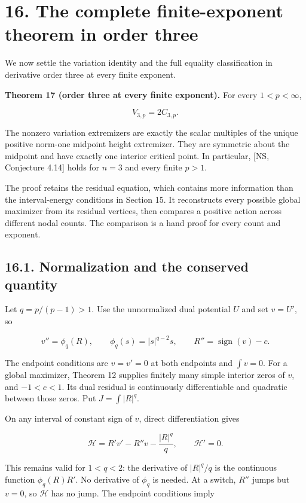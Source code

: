 \documentclass[11pt]{article}
\begin{document}
\section{16. The complete finite-exponent theorem in order
three}\label{the-complete-finite-exponent-theorem-in-order-three}

We now settle the variation identity and the full equality
classification in derivative order three at every finite exponent.

\textbf{Theorem 17 (order three at every finite exponent).} For every
\(1<p<\infty\),

\[
V_{3,p}=2C_{3,p}.
\tag{16.1}
\]

The nonzero variation extremizers are exactly the scalar multiples of
the unique positive norm-one midpoint height extremizer. They are
symmetric about the midpoint and have exactly one interior critical
point. In particular, {[}NS, Conjecture 4.14{]} holds for \(n=3\) and
every finite \(p>1\).

The proof retains the residual equation, which contains more information
than the interval-energy conditions in Section 15. It reconstructs every
possible global maximizer from its residual vertices, then compares a
positive action across different nodal counts. The comparison is a hand
proof for every count and exponent.

\subsection{16.1. Normalization and the conserved
quantity}\label{normalization-and-the-conserved-quantity}

Let \(q=p/(p-1)>1\). Use the unnormalized dual potential \(U\) and set
\(v=U'\), so

\[
v''=\phi_q(R),\qquad \phi_q(s)=|s|^{q-2}s,
\qquad R''=\operatorname{sign}(v)-c.
\]

The endpoint conditions are \(v=v'=0\) at both endpoints and
\(\int v=0\). For a global maximizer, Theorem 12 supplies finitely many
simple interior zeros of \(v\), and \(-1<c<1\). Its dual residual is
continuously differentiable and quadratic between those zeros. Put
\(J=\int |R|^q\).

On any interval of constant sign of \(v\), direct differentiation gives

\[
\mathcal H=R'v'-R''v-\frac{|R|^q}{q},\qquad \mathcal H'=0.
\tag{16.2}
\]

This remains valid for \(1<q<2\): the derivative of \(|R|^q/q\) is the
continuous function \(\phi_q(R)R'\). No derivative of \(\phi_q\) is
needed. At a switch, \(R''\) jumps but \(v=0\), so \(\mathcal H\) has no
jump. The endpoint conditions imply
\end{document}

